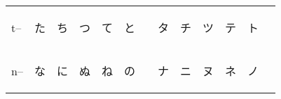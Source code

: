 \begin{table}[H]
\begin{tabular}{l|cccccc|cccccc}
		   t-- & {\begin{CJK}{UTF8}{min} た \end{CJK}} & {\begin{CJK}{UTF8}{min} ち \end{CJK}} & {\begin{CJK}{UTF8}{min} つ \end{CJK}} & {\begin{CJK}{UTF8}{min} て \end{CJK}} & {\begin{CJK}{UTF8}{min} と \end{CJK}} &                                       & {\begin{CJK}{UTF8}{min} タ \end{CJK}} & {\begin{CJK}{UTF8}{min} チ \end{CJK}} & {\begin{CJK}{UTF8}{min} ツ \end{CJK}} & {\begin{CJK}{UTF8}{min} テ \end{CJK}} & {\begin{CJK}{UTF8}{min} ト \end{CJK}} &                                      \\
           n-- & {\begin{CJK}{UTF8}{min} な \end{CJK}} & {\begin{CJK}{UTF8}{min} に \end{CJK}} & {\begin{CJK}{UTF8}{min} ぬ \end{CJK}} & {\begin{CJK}{UTF8}{min} ね \end{CJK}} & {\begin{CJK}{UTF8}{min} の \end{CJK}} &                                       & {\begin{CJK}{UTF8}{min} ナ \end{CJK}} & {\begin{CJK}{UTF8}{min} ニ \end{CJK}} & {\begin{CJK}{UTF8}{min} ヌ \end{CJK}} & {\begin{CJK}{UTF8}{min} ネ \end{CJK}} & {\begin{CJK}{UTF8}{min} ノ \end{CJK}} &                                      \\

\end{tabular}
\end{table}
